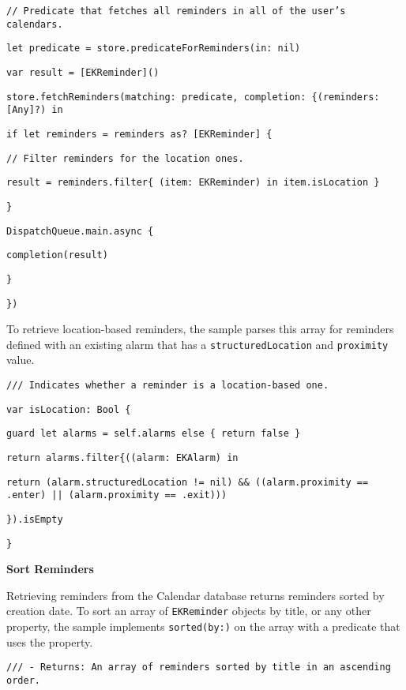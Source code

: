 \documentclass{article}
\begin{document}
\noindent
\texttt{// Predicate that fetches all reminders in all of the user's calendars.}

\noindent
\texttt{let predicate = store.predicateForReminders(in: nil)}

\noindent
\texttt{var result = [EKReminder]()}

\noindent
\texttt{store.fetchReminders(matching: predicate, completion: \{(reminders: [Any]?) in}

\noindent
\texttt{if let reminders = reminders as? [EKReminder] \{}

\noindent
\texttt{// Filter reminders for the location ones.}

\noindent
\texttt{result = reminders.filter\{ (item: EKReminder) in item.isLocation \}}

\noindent
\texttt{\}}

\noindent
\texttt{DispatchQueue.main.async \{}

\noindent
\texttt{completion(result)}

\noindent
\texttt{\}}

\noindent
\texttt{\})}

\noindent
To retrieve location-based reminders, the sample parses this array for reminders defined with an existing alarm that has a \texttt{structuredLocation} and \texttt{proximity} value.

\noindent
\texttt{/// Indicates whether a reminder is a location-based one.}

\noindent
\texttt{var isLocation: Bool \{}

\noindent
\texttt{guard let alarms = self.alarms else \{ return false \}}

\noindent
\texttt{return alarms.filter\{((alarm: EKAlarm) in}

\noindent
\texttt{return (alarm.structuredLocation != nil) \&\& ((alarm.proximity == .enter) || (alarm.proximity == .exit)))}

\noindent
\texttt{\}).isEmpty}

\noindent
\texttt{\}}

\noindent
\textbf{Sort Reminders}

\noindent
Retrieving reminders from the Calendar database returns reminders sorted by creation date. To sort an array of \texttt{EKReminder} objects by title, or any other property, the sample implements \texttt{sorted(by:)} on the array with a predicate that uses the property.

\noindent
\texttt{/// - Returns: An array of reminders sorted by title in an ascending order.}
\end{document}
